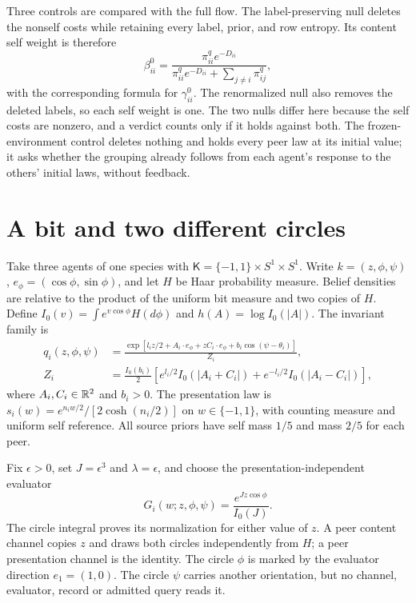 Three controls are compared with the full flow. The label-preserving null deletes the nonself costs while retaining every label, prior, and row entropy. Its content self weight is therefore
\begin{equation}
 \beta_{ii}^0=
 \frac{\pi_{ii}^qe^{-D_{ii}}}
 {\pi_{ii}^qe^{-D_{ii}}+\sum_{j\ne i}\pi_{ij}^q},
 \label{cp:null-row}
\end{equation}
with the corresponding formula for $\gamma_{ii}^0$. The renormalized null also removes the deleted labels, so each self weight is one. The two nulls differ here because the self costs are nonzero, and a verdict counts only if it holds against both. The frozen-environment control deletes nothing and holds every peer law at its initial value; it asks whether the grouping already follows from each agent's response to the others' initial laws, without feedback.

\section{A bit and two different circles}

Take three agents of one species with $\mathsf K=\{-1,1\}\times S^1\times S^1$. Write $k=(z,\phi,\psi)$, $e_\phi=(\cos\phi,\sin\phi)$, and let $H$ be Haar probability measure. Belief densities are relative to the product of the uniform bit measure and two copies of $H$. Define $I_0(v)=\int e^{v\cos\phi}H(d\phi)$ and $h(A)=\log I_0(|A|)$. The invariant family is
\begin{equation}
 \begin{aligned}
 q_i(z,\phi,\psi)
 &=\frac{\exp[l_i z/2+A_i\cdot e_\phi+zC_i\cdot e_\phi
                  +b_i\cos(\psi-\theta_i)]}{Z_i},\\
 Z_i&=\frac{I_0(b_i)}2
 \left[e^{l_i/2}I_0(|A_i+C_i|)
       +e^{-l_i/2}I_0(|A_i-C_i|)\right],
 \end{aligned}
 \label{cp:family}
\end{equation}
where $A_i,C_i\in\mathbb R^2$ and $b_i>0$. The presentation law is $s_i(w)=e^{n_iw/2}/[2\cosh(n_i/2)]$ on $w\in\{-1,1\}$, with counting measure and uniform self reference. All source priors have self mass $1/5$ and mass $2/5$ for each peer.

Fix $\epsilon>0$, set $J=\epsilon^3$ and $\lambda=\epsilon$, and choose the presentation-independent evaluator
\begin{equation}
 G_i(w;z,\phi,\psi)=\frac{e^{Jz\cos\phi}}{I_0(J)}.
 \label{cp:evaluator}
\end{equation}
The circle integral proves its normalization for either value of $z$. A peer content channel copies $z$ and draws both circles independently from $H$; a peer presentation channel is the identity. The circle $\phi$ is marked by the evaluator direction $e_1=(1,0)$. The circle $\psi$ carries another orientation, but no channel, evaluator, record or admitted query reads it.

